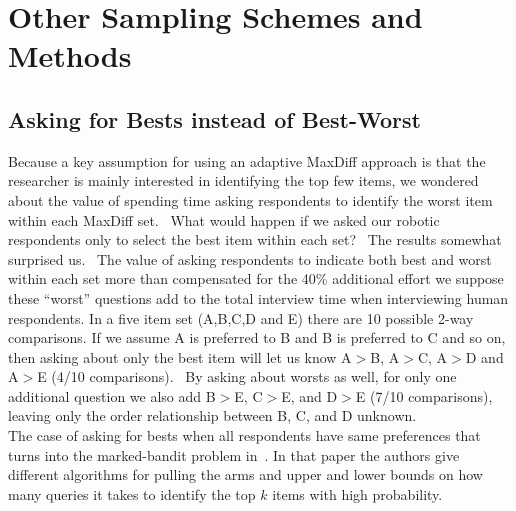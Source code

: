 \documentclass[nonblindrev]{informs3}
\begin{document}
\section{Other Sampling Schemes and Methods}
\subsection{Asking for Bests instead of Best-Worst}
Because a key assumption for using an adaptive MaxDiff approach is that the researcher is mainly interested in identifying the top few items, we wondered about the value of spending time asking respondents to identify the worst item within each MaxDiff set.  What would happen if we asked our robotic respondents only to select the best item within each set?  The results somewhat surprised us.  The value of asking respondents to indicate both best and worst within each set more than compensated for the 40\% additional effort we suppose these ``worst'' questions add to the total interview time when interviewing human respondents.
In a five item set (A,B,C,D and E) there are 10 possible 2-way comparisons. If we assume A is preferred to B and B is preferred to C and so on, then asking about only the best item will let us know A$>$B, A$>$C, A$>$D and A$>$E (4/10 comparisons).  By asking about worsts as well, for only one additional question we also add B$>$E, C$>$E, and D$>$E (7/10 comparisons), leaving only the order relationship between B, C, and D unknown.\\ 
The case of asking for bests when all respondents have same preferences that turns into the marked-bandit problem in~\cite{simchowitz2016best}. In that paper the authors give different algorithms for pulling the arms and upper and lower bounds on how many queries it takes to identify the top $k$ items with high probability. 
\end{document}
